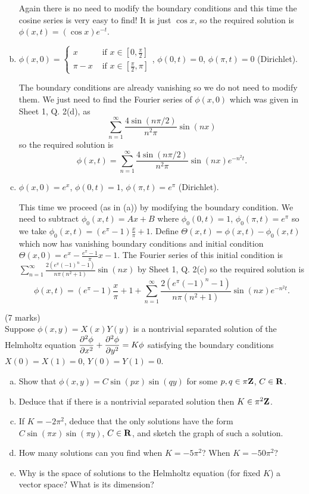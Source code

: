 \documentclass[12pt]{article}
\begin{document}
\begin{answer}
\begin{enumerate}[(a)]
Again there is no need to modify the boundary conditions and this time the cosine series is very easy to find! It is just $\cos x$, so the required solution is $\phi(x,t)=(\cos x)e^{-t}$.
\item $\phi(x,0)=\begin{cases}x&\mbox{ if }x\in\left[0,\tfrac{\pi}{2}\right]\\ \pi-x&\mbox{ if }x\in\left[\tfrac{\pi}{2},\pi\right]\end{cases}$, $\phi(0,t)=0$, $\phi(\pi,t)=0$ (Dirichlet).

The boundary conditions are already vanishing so we do not need to modify them. We just need to find the Fourier series of $\phi(x,0)$ which was given in Sheet 1, Q. 2(d), as
\[\sum_{n=1}^{\infty}\frac{4\sin(n\pi/2)}{n^2\pi}\sin(nx)\]
so the required solution is
\[\phi(x,t)=\sum_{n=1}^{\infty}\frac{4\sin(n\pi/2)}{n^2\pi}\sin(nx)e^{-n^2t}.\]
\item $\phi(x,0)=e^x$, $\phi(0,t)=1$, $\phi(\pi,t)=e^{\pi}$ (Dirichlet).

This time we proceed (as in (a)) by modifying the boundary condition. We need to subtract $\phi_0(x,t)=Ax+B$ where $\phi_0(0,t)=1$, $\phi_0(\pi,t)=e^{\pi}$ so we take $\phi_0(x,t)=(e^{\pi}-1)\frac{x}{\pi}+1$. Define $\Theta(x,t)=\phi(x,t)-\phi_0(x,t)$ which now has vanishing boundary conditions and initial condition $\Theta(x,0)=e^x-\frac{e^{\pi}-1}{\pi}x-1$. The Fourier series of this initial condition is $\sum_{n=1}^{\infty}\frac{2(e^{\pi}(-1)^n-1)}{n\pi(n^2+1)}\sin(nx)$ by Sheet 1, Q. 2(c) so the required solution is
\[\phi(x,t)=(e^{\pi}-1)\frac{x}{\pi}+1+\sum_{n=1}^{\infty}\frac{2(e^{\pi}(-1)^n-1)}{n\pi(n^2+1)}\sin(nx)e^{-n^2t}.\]
\end{enumerate}
\end{answer}
\newpage

\begin{question}(7 marks)\\
Suppose $\phi(x,y)=X(x)Y(y)$ is a nontrivial separated solution of the Helmholtz equation $\dfrac{\partial^2 \phi}{\partial x^2}+\dfrac{\partial^2 \phi}{\partial y^2}=K\phi$ satisfying the boundary conditions $X(0)=X(1)=0$, $Y(0)=Y(1)=0$.
\begin{enumerate}[(a)]
\item Show that $\phi(x,y)=C\sin(px)\sin(qy)$ for some $p,q\in\pi\mathbf{Z}$, $C\in\mathbf{R}$.
\item Deduce that if there is a nontrivial separated solution then $K\in\pi^2\mathbf{Z}$.
\item If $K=-2\pi^2$, deduce that the only solutions have the form $C\sin(\pi x)\sin(\pi y)$, $C\in\mathbf{R}$, and sketch the graph of such a solution.
\item How many solutions can you find when $K=-5\pi^2$? When $K=-50\pi^2$?
\item Why is the space of solutions to the Helmholtz equation (for fixed $K$) a vector space? What is its dimension?
\end{enumerate}
\end{question}
\end{document}
